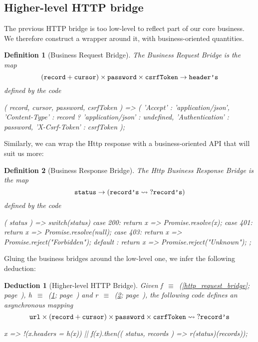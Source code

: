 \documentclass[12pt,a4paper]{report}
\newtheorem{definition}{Definition}
\newtheorem{deduction}{Deduction}
\newcommand{\symboldef}[2]{#1\ $\equiv$\ (\ref{#2}; page~\pageref{#2})}
\begin{document}
\subsection{Higher-level HTTP bridge}

The previous HTTP bridge is too low-level to reflect part of
our core business. We therefore construct a wrapper around it,
with business-oriented quantities.

\begin{definition}[Business Request Bridge]\label{http_business_request_bridge}
The Business Request Bridge is the map
	\[
	{
	  (\texttt{record} + \texttt{cursor})\times \texttt{password}\times\texttt{csrfToken}
	}\to{
	  {{\texttt{header}}\texttt{'s}}
	} \]
defined by the code
\begin{code}
({ record, cursor, password, csrfToken }) => ({
  'Accept'         : 'application/json',
  'Content-Type'   : record ? 'application/json' : undefined,
  'Authentication' : password,
  'X-Csrf-Token'   : csrfToken
 });
\end{code}
\end{definition}

Similarly, we can wrap the Http response with a business-oriented
API that will suit us more:

\begin{definition}[Business Response Bridge]\label{http_business_response_bridge}
The Http Business Response Bridge is the map
	\[ {
	  \texttt{status}
	}\to{
	  ({{{\texttt{record}}\texttt{'s}}}\rightsquigarrow{?{{{\texttt{record}}\texttt{'s}}}})
	}
	\]
defined by the code
\begin{code}
({ status }) => {
  switch(status) {
    case 200: return x => Promise.resolve(x);
    case 401: return x => Promise.resolve(null);
    case 403: return x => Promise.reject("Forbidden");
    default : return x => Promise.reject("Unknown");
  }
};
\end{code}
\end{definition}

Gluing the business bridges around the low-level one,
we infer the following deduction:

\begin{deduction}[Higher-level HTTP Bridge]\label{http_business_bridge}
Given \symboldef{f}{http_request_bridge}, \symboldef{h}{http_business_request_bridge}
and \symboldef{r}{http_business_response_bridge},
the following code defines an asynchronous mapping
	\[
	{
	  \texttt{url}\times(\texttt{record} + \texttt{cursor})\times
		\texttt{password}\times\texttt{csrfToken}
	}\rightsquigarrow{
	  ?{{{\texttt{record}}\texttt{'s}}}
	}
	\]
\begin{code}
x => !(x.headers = h(x))
     || f(x).then(({ status, records }) => r(status)(records));
\end{code}
\end{deduction}
\end{document}
